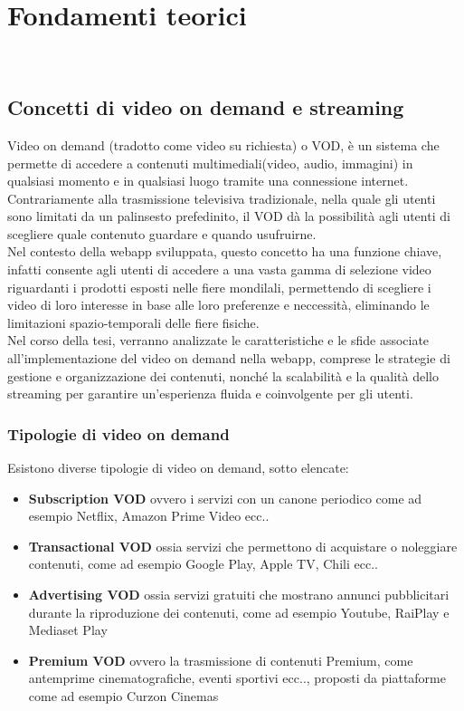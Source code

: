 \chapter{Fondamenti teorici}
\label{cap:fondamentiteorici}
\\

\section{Concetti di video on demand e streaming}
Video on demand (tradotto come video su richiesta) o VOD, è un sistema che permette di accedere a contenuti multimediali(video, audio, immagini) 
in qualsiasi momento e in qualsiasi luogo tramite una connessione internet.
Contrariamente alla trasmissione televisiva tradizionale, nella quale gli utenti sono limitati da un palinsesto prefedinito, 
il VOD dà la possibilità agli utenti di scegliere quale contenuto guardare e quando usufruirne.\\
Nel contesto della webapp sviluppata, questo concetto ha una funzione chiave, infatti consente agli utenti di accedere a una vasta gamma di selezione video riguardanti 
i prodotti esposti nelle fiere mondilali, 
permettendo di scegliere i video di loro interesse in base alle loro preferenze e neccessità, eliminando le limitazioni spazio-temporali delle fiere fisiche.\\
Nel corso della tesi, verranno analizzate le caratteristiche e le sfide associate all'implementazione del video on demand nella webapp, comprese le strategie 
di gestione e organizzazione dei contenuti, nonché la scalabilità e la qualità dello streaming per garantire un'esperienza fluida e coinvolgente per gli utenti.
\subsection{Tipologie di video on demand}
Esistono diverse tipologie di video on demand, sotto elencate:

\begin{itemize}
    \item \textbf{Subscription VOD} ovvero i servizi con un canone periodico come ad esempio Netflix, Amazon Prime Video ecc..\\
    \item \textbf{Transactional VOD} ossia servizi che permettono di acquistare o noleggiare contenuti, come ad esempio Google Play, Apple TV, Chili ecc..\\
    \item \textbf{Advertising VOD} ossia servizi gratuiti che mostrano annunci pubblicitari durante la riproduzione dei contenuti, come ad esempio Youtube, RaiPlay e Mediaset Play\\
    \item \textbf{Premium VOD} ovvero la trasmissione di contenuti Premium, come antemprime cinematografiche, eventi sportivi ecc.., proposti da piattaforme come ad esempio Curzon Cinemas\\
\end{itemize}

